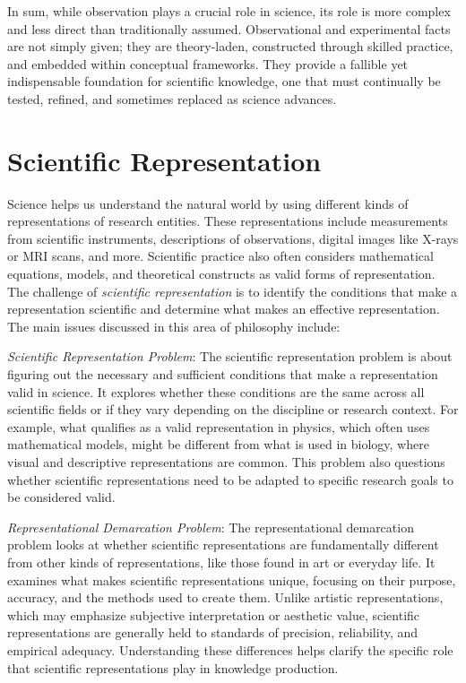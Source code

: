In sum, while observation plays a crucial role in science, its role is more complex and less direct than traditionally assumed. Observational and experimental facts are not simply given; they are theory-laden, constructed through skilled practice, and embedded within conceptual frameworks. They provide a fallible yet indispensable foundation for scientific knowledge, one that must continually be tested, refined, and sometimes replaced as science advances.


%
%

\section{Scientific Representation}
\label{sec:scientific_representation}

Science helps us understand the natural world by using different kinds of representations of research entities. These representations include measurements from scientific instruments, descriptions of observations, digital images like X-rays or MRI scans, and more. Scientific practice also often considers mathematical equations, models, and theoretical constructs as valid forms of representation. The challenge of \emph{scientific representation} is to identify the conditions that make a representation scientific and determine what makes an effective representation. The main issues discussed in this area of philosophy include:

\emph{Scientific Representation Problem}: The scientific representation problem is about figuring out the necessary and sufficient conditions that make a representation valid in science. It explores whether these conditions are the same across all scientific fields or if they vary depending on the discipline or research context. For example, what qualifies as a valid representation in physics, which often uses mathematical models, might be different from what is used in biology, where visual and descriptive representations are common. This problem also questions whether scientific representations need to be adapted to specific research goals to be considered valid.

\emph{Representational Demarcation Problem}: The representational demarcation problem looks at whether scientific representations are fundamentally different from other kinds of representations, like those found in art or everyday life. It examines what makes scientific representations unique, focusing on their purpose, accuracy, and the methods used to create them. Unlike artistic representations, which may emphasize subjective interpretation or aesthetic value, scientific representations are generally held to standards of precision, reliability, and empirical adequacy. Understanding these differences helps clarify the specific role that scientific representations play in knowledge production.


